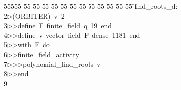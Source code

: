 %
%
\begin{tabbing}
55555 \= 55 \= 55 \= 55 \= 55 \= 55 \= 55 \= 55 \= 55 \= 55 \= 55 \= 55 \= 55 \= \>find\_roots\_d:\\[0pt]
2\>$\triangleright$\>(ORBITER)\ v\ 2\ \\[0pt]
3\>$\triangleright$\>$\triangleright$\>define\ F\ finite\_field\ q\ 19\ end\ \\[0pt]
4\>$\triangleright$\>$\triangleright$\>define\ v\ vector\ field\ F\ dense\ 1181\ end\ \\[0pt]
5\>$\triangleright$\>$\triangleright$\>with\ F\ do\ \\[0pt]
6\>$\triangleright$\>$\triangleright$\>finite\_field\_activity\ \\[0pt]
7\>$\triangleright$\>$\triangleright$\>$\triangleright$\>polynomial\_find\_roots\ v\ \\[0pt]
8\>$\triangleright$\>$\triangleright$\>end\\[0pt]
9\>\end{tabbing}
